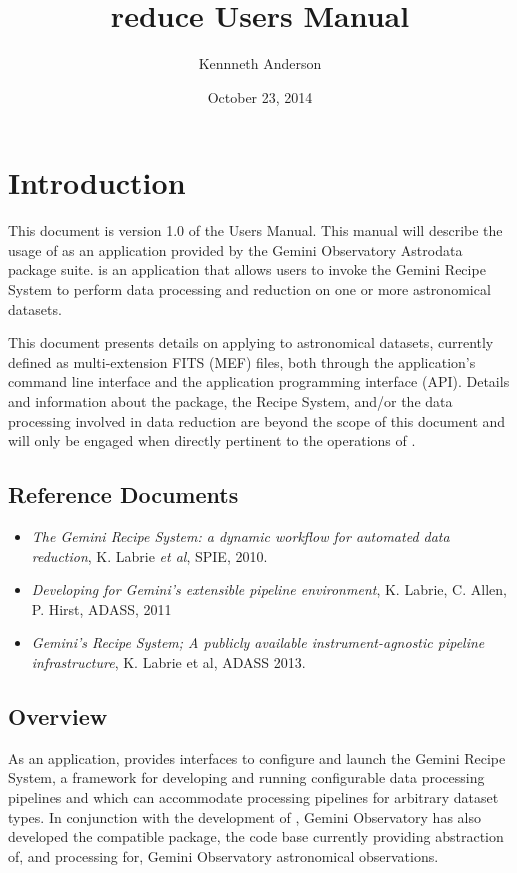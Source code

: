 \documentclass[letterpaper,10pt,english]{sphinxmanual}
\title{reduce Users Manual}
\date{October 23, 2014}
\author{Kennneth Anderson}
\begin{document}
\maketitle
\tableofcontents
{}\label{index-latex::doc}



\chapter{Introduction}
\label{intro:introduction}\label{intro:reduce-users-manual}\label{intro::doc}
This document is version 1.0 of the  Users Manual. This manual will
describe the usage of  as an application provided by the Gemini Observatory
Astrodata package suite.  is an application that allows users to invoke the
Gemini Recipe System to perform data processing and reduction on one or more
astronomical datasets.

This document presents details on applying  to astronomical datasets,
currently defined as multi-extension FITS (MEF) files, both through the application's
command line interface and the application programming interface (API). Details and
information about the  package, the Recipe System, and/or the data
processing involved in data reduction are beyond the scope of this document and
will only be engaged when directly pertinent to the operations of .


\section{Reference Documents}
\label{intro:reference-documents}\begin{itemize}
\item {} 
\emph{The Gemini Recipe System: a dynamic workflow for automated data reduction},
K. Labrie \emph{et al}, SPIE, 2010.

\item {} 
\emph{Developing for Gemini’s extensible pipeline environment}, K. Labrie,
C. Allen, P. Hirst, ADASS, 2011

\item {} 
\emph{Gemini's Recipe System; A publicly available instrument-agnostic pipeline
infrastructure}, K. Labrie et al, ADASS 2013.

\end{itemize}


\section{Overview}
\label{intro:overview}
As an application,  provides interfaces to configure and launch the
Gemini Recipe System, a framework for developing and running configurable data
processing pipelines and which can accommodate processing pipelines for arbitrary
dataset types. In conjunction with the development of , Gemini
Observatory has also developed the compatible  package, the
code base currently providing abstraction of, and processing for, Gemini
Observatory astronomical observations.
\end{document}
